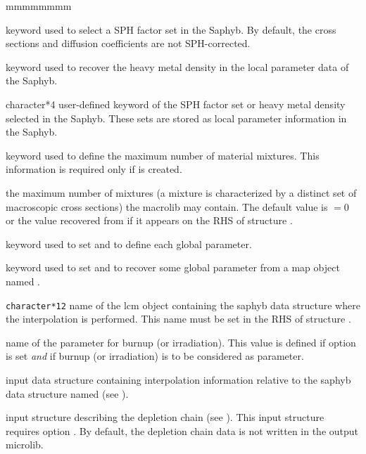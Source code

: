 \begin{ListeDeDescription}{mmmmmmmm}
\item[\moc{EQUI}] keyword used to select a SPH factor set in the Saphyb. By default, the cross sections and diffusion coefficients
are not SPH-corrected.

\item[\moc{MASL}] keyword used to recover the heavy metal density in the local parameter data of the Saphyb. 

\item[\dusa{TEXT4}] character*4 user-defined keyword of the SPH factor set or heavy metal density selected in the Saphyb. These sets are stored as local parameter information in the Saphyb.

\item[\moc{NMIX}] keyword used to define the maximum number of material mixtures. This information is required only if  is created.

\item[\dusa{nmixt}] the maximum number of mixtures (a mixture is characterized by a distinct set of 
macroscopic cross sections) the {\sc macrolib} may contain. The default value is  $=0$ or the value recovered from  if it appears on the RHS
of structure .

\item[\moc{SAPHYB}] keyword used to set  and to define each global parameter.

\item[\moc{TABLE}] keyword used to set  and to recover some global parameter from a {\sc map} object named .

\item[\dusa{SAPNAM}] {\tt character*12} name of the {\sc lcm} object containing the
{\sc saphyb} data structure where the interpolation is performed. This name must be set in the RHS of structure .

\item[\dusa{namburn}] name of the parameter for burnup (or irradiation).
This value is defined if option  is set {\sl and} if burnup (or irradiation) is to be considered as parameter.

\item[\dusa{descints}] input data structure containing interpolation information relative to the {\sc saphyb} data structure named  (see ).

\item[\dstr{descdepl}] input structure describing the depletion chain (see ). This input structure requires option . By
default, the depletion chain data is not written in the output {\sc microlib}.

\end{ListeDeDescription}

